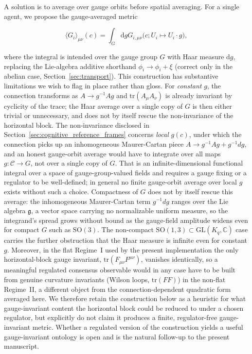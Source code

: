 \documentclass[11pt]{article}
\begin{document}
A solution is to average over gauge orbits before spatial averaging. For a single agent, we propose the gauge-averaged metric

\begin{equation}
\langle G_i \rangle_{\mu\nu}(c) = \int_G \mathrm{d}g  G_{i,\mu\nu}\big(c; U_i \mapsto U_i \cdot g\big),
\end{equation}

where the integral is intended over the gauge group $G$ with Haar measure $\mathrm{d}g$, replacing the Lie-algebra additive shorthand $\phi_i \to \phi_i + \xi$ (correct only in the abelian case, Section~\ref{sec:transport}). This construction has substantive limitations we wish to flag in place rather than gloss. For \emph{constant} $g$, the connection transforms as $A \to g^{-1}Ag$ and $\mathrm{tr}(A_\mu A_\nu)$ is already invariant by cyclicity of the trace; the Haar average over a single copy of $G$ is then either trivial or unnecessary, and does not by itself rescue the non-invariance of the horizontal block. The non-invariance disclosed in Section~\ref{sec:cognitive_reference_frames} concerns \emph{local} $g(c)$, under which the connection picks up an inhomogeneous Maurer-Cartan piece $A \to g^{-1}Ag + g^{-1}dg$, and an honest gauge-orbit average would have to integrate over all maps $g: \mathcal{C} \to G$, not over a single copy of $G$. That is an infinite-dimensional functional integral over a space of gauge-group-valued fields and requires a gauge fixing or a regulator to be well-defined; in general no finite gauge-orbit average over local $g$ exists without such a choice. Compactness of $G$ does not by itself rescue this average: the inhomogeneous Maurer-Cartan term $g^{-1}dg$ ranges over the Lie algebra $\mathfrak{g}$, a vector space carrying no normalizable uniform measure, so the integrand's spread grows without bound as the gauge-field amplitude widens even for compact $G$ such as $\mathrm{SO}(3)$. The non-compact $\mathrm{SO}(1,3) \subset \mathrm{GL}(K_q, \mathbb{C})$ case carries the further obstruction that the Haar measure is infinite even for constant $g$. Moreover, in the flat Regime~I used by the present implementation the only horizontal-block gauge invariant, $\mathrm{tr}(F_{\mu\nu}F^{\mu\nu})$, vanishes identically, so a meaningful regulated consensus observable would in any case have to be built from genuine curvature invariants (Wilson loops, $\mathrm{tr}(FF)$) in the non-flat Regime~II, a different object from the connection-dependent quadratic form averaged here. We therefore retain the construction below as a heuristic for what gauge-invariant content the horizontal block could be reduced to under a chosen regulator, but explicitly do not claim it produces a finite, regulator-free gauge-invariant metric. Whether a regulated version of the construction yields a useful gauge-invariant ontology is open and is the natural follow-up to the present manuscript.
\end{document}
